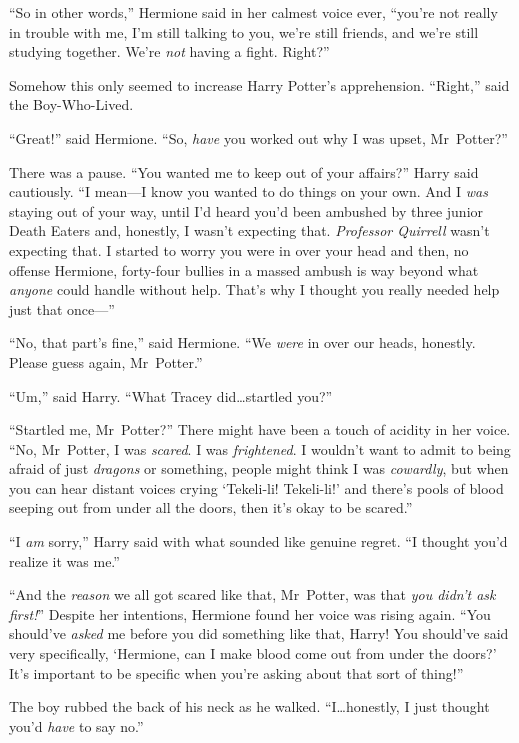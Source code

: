“So in other words,” Hermione said in her calmest voice ever, “you’re not really in trouble with me, I’m still talking to you, we’re still friends, and we’re still studying together. We’re \emph{not} having a fight. Right?”

Somehow this only seemed to increase Harry Potter’s apprehension.
“Right,” said the Boy-Who-Lived.

“Great!” said Hermione.
“So, \emph{have} you worked out why I was upset, Mr~Potter?”

There was a pause.
“You wanted me to keep out of your affairs?” Harry said cautiously.
“I mean—I know you wanted to do things on your own. And I \emph{was} staying out of your way, until I’d heard you’d been ambushed by three junior Death Eaters and, honestly, I wasn’t expecting that. \emph{Professor Quirrell} wasn’t expecting that. I started to worry you were in over your head and then, no offense Hermione, forty-four bullies in a massed ambush is way beyond what \emph{anyone} could handle without help. That’s why I thought you really needed help just that once—”

“No, that part’s fine,” said Hermione.
“We \emph{were} in over our heads, honestly. Please guess again, Mr~Potter.”

“Um,” said Harry.
“What Tracey did…startled you?”

“Startled me, Mr~Potter?” There might have been a touch of acidity in her voice.
“No, Mr~Potter, I was \emph{scared}. I was \emph{frightened}. I wouldn’t want to admit to being afraid of just \emph{dragons} or something, people might think I was \emph{cowardly}, but when you can hear distant voices crying ‘Tekeli-li! Tekeli-li!’ and there’s pools of blood seeping out from under all the doors, then it’s okay to be scared.”

“I \emph{am} sorry,” Harry said with what sounded like genuine regret.
“I thought you’d realize it was me.”

“And the \emph{reason} we all got scared like that, Mr~Potter, was that \emph{you didn’t ask first!}” Despite her intentions, Hermione found her voice was rising again.
“You should’ve \emph{asked} me before you did something like that, Harry! You should’ve said very specifically, ‘Hermione, can I make blood come out from under the doors?’ It’s important to be specific when you’re asking about that sort of thing!”

The boy rubbed the back of his neck as he walked.
“I…honestly, I just thought you’d \emph{have} to say no.”

